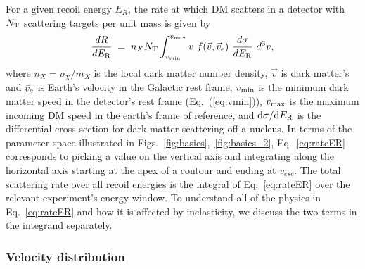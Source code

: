 \documentclass[11pt]{article}
\newcommand{\dd}{{\rm d}}
\begin{document}
For a given recoil energy $E_R$, the rate at which DM scatters in a detector with $N_{\rm T}$ scattering targets per unit mass is given by 
\begin{equation}
\frac{d R}{d E_{\rm R}} \; = \; n_{X}  N_{\rm T} \int_{v_{\rm min} }^{v_{\rm max}} v~f(\vec{v},\vec{v}_{\rm e})~\frac{d \sigma}{d E_{\rm R}}~ d^3v,
\label{eq:rateER}
\end{equation}
where $n_{X} = \rho_{X}/m_{X} $ is the local dark matter number density, $\vec{v}$ is dark matter's and $\vec{v}_{\rm e}$ is Earth's velocity in the Galactic rest frame, $v_{\rm min}$ is the minimum dark matter speed in the detector's rest frame (Eq.~(\ref{eq:vmin})), $v_{\rm max}$ is the maximum incoming DM speed in the earth's frame of reference, and $\dd \sigma / \dd E_{\rm R}$ is the differential cross-section for dark matter scattering off a nucleus. In terms of the parameter space illustrated in Figs.~\ref{fig:basics},~\ref{fig:basics_2}, Eq.~\eqref{eq:rateER} corresponds to picking a value on the vertical axis and integrating along the horizontal axis starting at the apex of a contour and ending at $v_{esc}$. The total scattering rate over all recoil energies is the integral of Eq.~\eqref{eq:rateER} over the relevant experiment's energy window. To understand all of the physics in Eq.~\eqref{eq:rateER} and how it is affected by inelasticity, we discuss the two terms in the integrand separately.


\subsubsection*{Velocity distribution}
\end{document}
